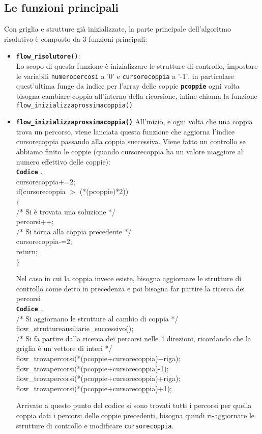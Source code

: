 \documentclass[11pt,a4paper,twocolumn]{IEEEtran}
\newcommand{\bsepline}{\noindent\makebox[\linewidth]{\rule{7.5cm}{1.2pt}}}
\newcommand{\esepline}{\noindent\makebox[\linewidth]{\rule{7.5cm}{0.5pt}}}
\newcommand{\code}[1]{\textbf{\texttt{#1}}}
\newcounter{algoritmo}
\newenvironment{algoritmo}{\bsepline\\{\large \code{Codice} \arabic{section}.\arabic{algoritmo}}\\ \bsepline}{\\\esepline\addtocounter{algoritmo}{1}}
\begin{document}
\subsection*{Le funzioni principali}	
	Con griglia e strutture già inizializzate, la parte principale dell'algoritmo risolutivo è composto da 3 funzioni principali:
	\begin{itemize}
		\item \code{flow\_risolutore()}:\\
		Lo scopo di questa funzione è inizializzare le strutture di controllo, impostare le variabili \texttt{numeropercosi} a '0' e \texttt{cursorecoppia} a '-1', in particolare quest'ultima funge da indice per l'array delle coppie \code{pcoppie} ogni volta bisogna cambiare coppia all'interno della ricorsione, infine chiama la funzione \texttt{flow\_inizializzaprossimacoppia()}\medskip\\
		\item \code{flow\_inizializzaprossimacoppia()}
		All'inizio, e ogni volta che una coppia trova un percorso, viene lanciata questa funzione che aggiorna l'indice cursorecoppia passando alla coppia successiva. Viene fatto un controllo se abbiamo finito le coppie (quando cursorecoppia ha un valore maggiore al numero effettivo delle coppie):\newpage
		\begin{algoritmo}
{\small		cursorecoppia+=2;\medskip\\
			if(cursorecoppia $>$ (*(pcoppie)*2))\\
			\text{ }\{\\
			\text{ }\quad/* Si è trovata una soluzione */\\
			\text{ }\quad percorsi++;\\
			\text{ }\quad
			 /* Si torna alla coppia precedente */\\
			\text{ }\quad cursorecoppia-=2;\medskip\\
			\text{ }\quad return;}\\
			\text{ }\}
		\end{algoritmo}
	Nel caso in cui la coppia invece esiste, bisogna aggiornare le strutture di controllo come detto in precedenza e poi bisogna far partire la ricerca dei percorsi
	\begin{algoritmo}
		{\small
		/* Si aggiornano le strutture al cambio di coppia */\\
		flow\_struttureausiliarie\_successivo();\medskip\\
		
		/* Si fa partire dalla ricerca dei percorsi nelle 4 direzioni,		ricordando che la griglia è un vettore di interi */	}\\
		{\small flow\_trovapercorsi(*(pcoppie+cursorecoppia)$-$riga);\\
			flow\_trovapercorsi(*(pcoppie+cursorecoppia)-1);\\
			flow\_trovapercorsi(*(pcoppie+cursorecoppia)+riga);\\
			flow\_trovapercorsi(*(pcoppie+cursorecoppia)+1);}
	\end{algoritmo}
	Arrivato a questo punto del codice si sono trovati tutti i percorsi per quella coppia dati i percorsi delle coppie precedenti, bisogna quindi ri-aggiornare le strutture di controllo e modificare \texttt{cursorecoppia}.
	

\end{itemize}
\end{document}
